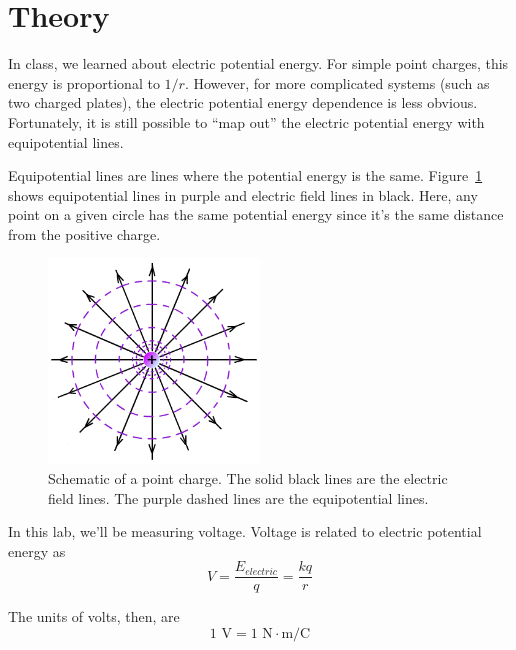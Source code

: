 \documentclass[12pt]{article}
\begin{document}
\section*{Theory}
In class, we learned about electric potential energy. For simple point charges, this energy is proportional to $1/r$. However, for more complicated systems (such as two charged plates), the electric potential energy dependence is less obvious. Fortunately, it is still possible to ``map out'' the electric potential energy with equipotential lines. 

Equipotential lines are lines where the potential energy is the same. Figure~\ref{fig:equipotential} shows equipotential lines in purple and electric field lines in black. Here, any point on a given circle has the same potential energy since it's the same distance from the positive charge.

\begin{figure}[!h]
\begin{center}
\includegraphics[width=0.5\textwidth]{equipotential}
\caption{Schematic of a point charge. The solid black lines are the electric field lines. The purple dashed lines are the equipotential lines.}
\label{fig:equipotential}
\end{center}
\end{figure}

In this lab, we'll be measuring voltage. Voltage is related to electric potential energy as
\[
V = \frac{E_{electric}}{q}=\frac{kq}{r}
\]

The units of volts, then, are
\[
1\text{ V} = 1\text{ N}\cdot\text{m}/\text{C}
\]
\end{document}
